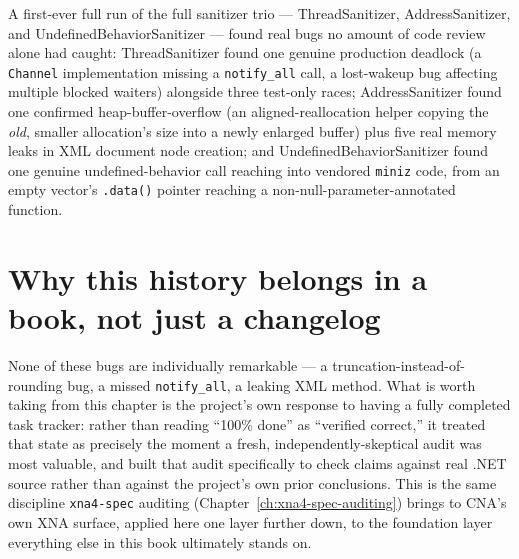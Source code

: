 A first-ever full run of the full sanitizer trio --- ThreadSanitizer, AddressSanitizer, and
UndefinedBehaviorSanitizer --- found real bugs no amount of code review alone had caught:
ThreadSanitizer found one genuine production deadlock (a \texttt{Channel} implementation
missing a \texttt{notify\_all} call, a lost-wakeup bug affecting multiple blocked waiters)
alongside three test-only races; AddressSanitizer found one confirmed heap-buffer-overflow (an
aligned-reallocation helper copying the \emph{old}, smaller allocation's size into a newly
enlarged buffer) plus five real memory leaks in XML document node creation; and
UndefinedBehaviorSanitizer found one genuine undefined-behavior call reaching into vendored
\texttt{miniz} code, from an empty vector's \texttt{.data()} pointer reaching a
non-null-parameter-annotated function.

\section{Why this history belongs in a book, not just a changelog}

None of these bugs are individually remarkable --- a truncation-instead-of-rounding bug, a
missed \texttt{notify\_all}, a leaking XML method. What is worth taking from this chapter is
the project's own response to having a fully completed task tracker: rather than reading
``100\% done'' as ``verified correct,'' it treated that state as precisely the moment a fresh,
independently-skeptical audit was most valuable, and built that audit specifically to check
claims against real .NET source rather than against the project's own prior conclusions. This
is the same discipline \texttt{xna4-spec} auditing (Chapter~\ref{ch:xna4-spec-auditing})
brings to CNA's own XNA surface, applied here one layer further down, to the foundation layer
everything else in this book ultimately stands on.
